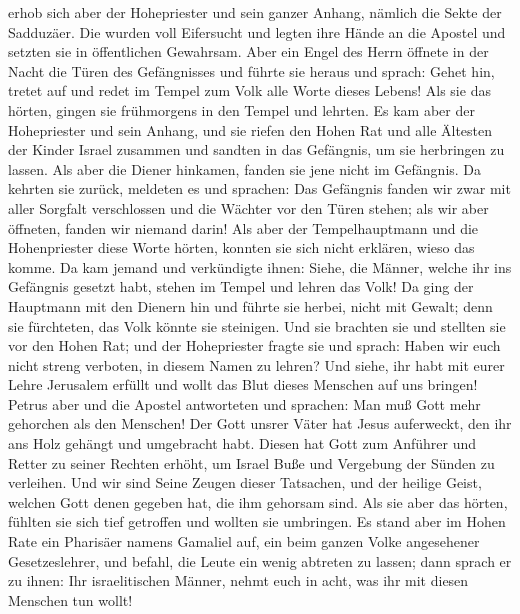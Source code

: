 erhob sich aber der Hohepriester und sein ganzer Anhang, nämlich die
Sekte der Sadduzäer.  Die wurden voll Eifersucht und
legten ihre Hände an die Apostel und setzten sie in öffentlichen
Gewahrsam.  Aber ein Engel des Herrn öffnete in der Nacht
die Türen des Gefängnisses und führte sie heraus und sprach:
 Gehet hin, tretet auf und redet im Tempel zum Volk alle
Worte dieses Lebens!  Als sie das hörten, gingen sie
frühmorgens in den Tempel und lehrten. Es kam aber der Hohepriester und
sein Anhang, und sie riefen den Hohen Rat und alle Ältesten der Kinder
Israel zusammen und sandten in das Gefängnis, um sie herbringen zu
lassen.  Als aber die Diener hinkamen, fanden sie jene
nicht im Gefängnis. Da kehrten sie zurück, meldeten es und sprachen:
 Das Gefängnis fanden wir zwar mit aller Sorgfalt
verschlossen und die Wächter vor den Türen stehen; als wir aber
öffneten, fanden wir niemand darin!  Als aber der
Tempelhauptmann und die Hohenpriester diese Worte hörten, konnten sie
sich nicht erklären, wieso das komme.  Da kam jemand und
verkündigte ihnen: Siehe, die Männer, welche ihr ins Gefängnis gesetzt
habt, stehen im Tempel und lehren das Volk!  Da ging der
Hauptmann mit den Dienern hin und führte sie herbei, nicht mit Gewalt;
denn sie fürchteten, das Volk könnte sie steinigen.  Und
sie brachten sie und stellten sie vor den Hohen Rat; und der
Hohepriester fragte sie und sprach:  Haben wir euch nicht
streng verboten, in diesem Namen zu lehren? Und siehe, ihr habt mit
eurer Lehre Jerusalem erfüllt und wollt das Blut dieses Menschen auf uns
bringen!  Petrus aber und die Apostel antworteten und
sprachen: Man muß Gott mehr gehorchen als den Menschen! 
Der Gott unsrer Väter hat Jesus auferweckt, den ihr ans Holz gehängt und
umgebracht habt.  Diesen hat Gott zum Anführer und Retter
zu seiner Rechten erhöht, um Israel Buße und Vergebung der Sünden zu
verleihen.  Und wir sind Seine Zeugen dieser Tatsachen,
und der heilige Geist, welchen Gott denen gegeben hat, die ihm gehorsam
sind.  Als sie aber das hörten, fühlten sie sich tief
getroffen und wollten sie umbringen.  Es stand aber im
Hohen Rate ein Pharisäer namens Gamaliel auf, ein beim ganzen Volke
angesehener Gesetzeslehrer, und befahl, die Leute ein wenig abtreten zu
lassen;  dann sprach er zu ihnen: Ihr israelitischen
Männer, nehmt euch in acht, was ihr mit diesen Menschen tun wollt!

